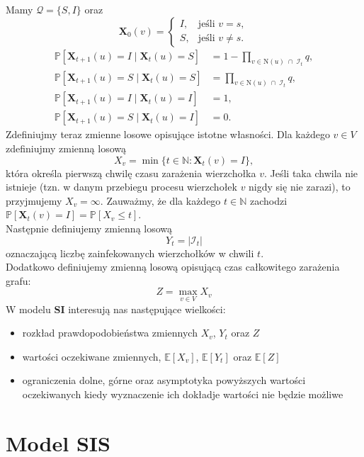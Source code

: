 Mamy $\mathcal{Q} = \{S, I\}$ oraz
\[
\mathbf{X}_0(v) =
\begin{cases}
I, & \text{jeśli } v = s, \\[4pt]
S, & \text{jeśli } v \neq s.
\end{cases}
\]
\[
\begin{aligned}
\mathbb{P}[\mathbf{X}_{t+1}(u) = I \mid \mathbf{X}_t(u) = S]
 &= 1 - \prod_{v \in \mathrm{N}(u) \;\cap\; \mathcal{I}_t} q, \\[6pt]
\mathbb{P}[\mathbf{X}_{t+1}(u) = S \mid \mathbf{X}_t(u) = S]
 &= \prod_{v \in \mathrm{N}(u) \;\cap\; \mathcal{I}_t} q, \\[6pt]
\mathbb{P}[\mathbf{X}_{t+1}(u) = I \mid \mathbf{X}_t(u) = I]
 &= 1, \\[6pt]
\mathbb{P}[\mathbf{X}_{t+1}(u) = S \mid \mathbf{X}_t(u) = I]
 &= 0.
\end{aligned}
\]
Zdefiniujmy teraz zmienne losowe opisujące istotne własności.
Dla każdego $v \in V$ zdefiniujmy zmienną losową
\[
X_v = \min \{ t \in \mathbb{N} : \mathbf{X}_t(v) = I \},
\]
która określa pierwszą chwilę czasu zarażenia wierzchołka $v$.
Jeśli taka chwila nie istnieje (tzn. w danym przebiegu procesu wierzchołek $v$ nigdy się nie zarazi),
to przyjmujemy $X_v = \infty$.
Zauważmy, że dla każdego $t \in \mathbb{N}$ zachodzi $ \mathbb{P}[\mathbf{X}_t(v) = I] = \mathbb{P}[X_v \le t] $. \\
Następnie definiujemy zmienną losową 
\[
    Y_t = |\mathcal{I}_t|
\]
oznaczającą liczbę zainfekowanych wierzchołków w chwili $t$. \\ 
Dodatkowo definiujemy zmienną losową opisującą czas całkowitego zarażenia grafu:
\[
    Z = \max_{v \in V} X_v
\]
W modelu \textbf{SI} interesują nas następujące wielkości:
\begin{itemize}
    \item rozkład prawdopodobieństwa zmiennych $X_v$, $Y_t$ oraz $Z$
    \item wartości oczekiwane zmiennych, $\mathbb{E}[X_v]$, $\mathbb{E}[Y_t]$ oraz $\mathbb{E}[Z]$
    \item ograniczenia dolne, górne oraz asymptotyka powyższych wartości oczekiwanych kiedy wyznaczenie ich dokładje wartości nie będzie możliwe
\end{itemize}



\section{Model SIS}

